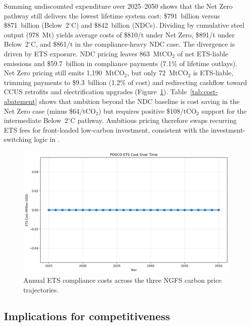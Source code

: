 \documentclass[preprint,1p,authoryear]{elsarticle}
\begin{document}
Summing undiscounted expenditure over 2025--2050 shows that the Net Zero pathway still delivers the lowest lifetime system cost: \$791~billion versus \$871~billion (Below~2$^\circ$C) and \$842~billion (NDCs). Dividing by cumulative steel output (978~Mt) yields average costs of \$810/t under Net Zero, \$891/t under Below~2$^\circ$C, and \$861/t in the compliance-heavy NDC case. The divergence is driven by ETS exposure. NDC pricing leaves 863~MtCO$_2$ of net ETS-liable emissions and \$59.7~billion in compliance payments (7.1\% of lifetime outlays). Net Zero pricing still emits 1,190~MtCO$_2$, but only 72~MtCO$_2$ is ETS-liable, trimming payments to \$9.3~billion (1.2\% of cost) and redirecting cashflow toward CCUS retrofits and electrification upgrades (Figure~\ref{fig:ets-costs}). Table~\ref{tab:cost-abatement} shows that ambition beyond the NDC baseline is cost saving in the Net Zero case (minus \$64/tCO$_2$) but requires positive \$108/tCO$_2$ support for the intermediate Below~2$^\circ$C pathway. Ambitious pricing therefore swaps recurring ETS fees for front-loaded low-carbon investment, consistent with the investment-switching logic in \citet{fowlie2016carbon}.

\begin{figure}[!t]
  \centering
  \includegraphics[width=0.8\linewidth]{ets_cost_by_scenario}
  \caption{Annual ETS compliance costs across the three NGFS carbon price trajectories.}
  \label{fig:ets-costs}
\end{figure}

\subsection{Implications for competitiveness}
\end{document}
